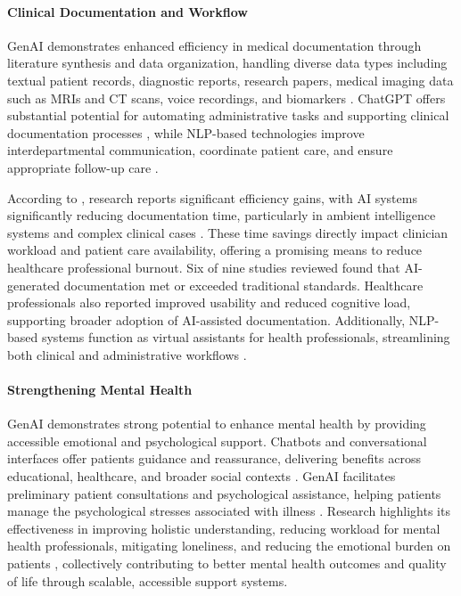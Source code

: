 \paragraph{Clinical Documentation and Workflow}
GenAI demonstrates enhanced efficiency in medical documentation through literature synthesis and data organization, handling diverse data types including textual patient records, diagnostic reports, research papers, medical imaging data such as MRIs and CT scans, voice recordings, and biomarkers \parencite{S01}. ChatGPT offers substantial potential for automating administrative tasks \parencite{S03} and supporting clinical documentation processes \parencite{S02}, while NLP-based technologies improve interdepartmental communication, coordinate patient care, and ensure appropriate follow-up care \parencite{S10}.

According to \citeauthor{S05}, research reports significant efficiency gains, with AI systems significantly reducing documentation time, particularly in ambient intelligence systems and complex clinical cases \parencite*{S05}. These time savings directly impact clinician workload and patient care availability, offering a promising means to reduce healthcare professional burnout. Six of nine studies reviewed found that AI-generated documentation met or exceeded traditional standards. Healthcare professionals also reported improved usability and reduced cognitive load, supporting broader adoption of AI-assisted documentation. Additionally, NLP-based systems function as virtual assistants for health professionals, streamlining both clinical and administrative workflows \parencite{S10}.

\paragraph{Strengthening Mental Health}
GenAI demonstrates strong potential to enhance mental health by providing accessible emotional and psychological support. Chatbots and conversational interfaces offer patients guidance and reassurance, delivering benefits across educational, healthcare, and broader social contexts \parencite{R09}. GenAI facilitates preliminary patient consultations and psychological assistance, helping patients manage the psychological stresses associated with illness \parencite{S01}. Research highlights its effectiveness in improving holistic understanding, reducing workload for mental health professionals, mitigating loneliness, and reducing the emotional burden on patients \parencite{S17}, collectively contributing to better mental health outcomes and quality of life through scalable, accessible support systems.

